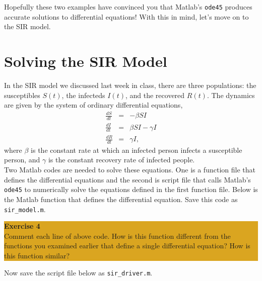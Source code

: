 \documentclass[12pt]{amsart}
\begin{document}
\noindent Hopefully these two examples have convinced you that Matlab's \verb+ode45+ produces accurate solutions to differential equations!  With this in mind, let's move on to the SIR model.




\section{Solving the SIR Model}

\noindent In the SIR model we discussed last week in class, there are three populations: the susceptibles $S(t)$, the infecteds $I(t)$, and the recovered $R(t)$.  The dynamics are given by the system of ordinary differential equations,
\begin{eqnarray}
\frac{d S}{d t} &=& - \beta S I \nonumber \\
\frac{d I}{d t} &=&  \beta S I - \gamma I \nonumber \\
\frac{d R}{d t} &=& \gamma I, \nonumber
\end{eqnarray}
where $\beta$ is the constant rate at which an infected person infects a susceptible person, and $\gamma$ is the constant recovery rate of infected people.  \\


\noindent Two Matlab codes are needed to solve these equations.  One is a function file that defines the differential equations and the second is script file that calls Matlab's \verb+ode45+ to numerically solve the equations defined in the first function file.  Below is the Matlab function that defines the differential equation.  Save this code as \verb+sir_model.m+.%



\begin{center}
\colorbox{Goldenrod}{\parbox{15cm}{
{
\textbf{\large Exercise 4}\vspace{1mm} \\
Comment each line of above code.  How is this function different from the functions you examined earlier that define a single differential equation?  How is this function similar?
}}}
\end{center}
\vspace{.1in}

\noindent Now save the script file below as \verb+sir_driver.m+.
\vspace{.1in}

\end{document}
